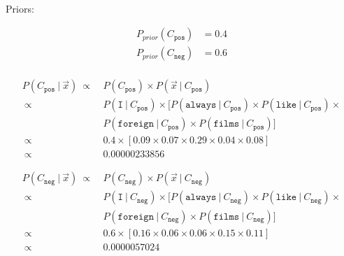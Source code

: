 \documentclass{article}
\newcommand\given[1][]{\ #1\vert\ }
\begin{document}
\paragraph{} Priors:

\begin{equation}
    \begin{split}
        P_{prior}(C_{\texttt{pos}}) &= 0.4 \\
        P_{prior}(C_{\texttt{neg}}) &= 0.6 \\
    \end{split}
\end{equation}

\begin{equation}
    \begin{split}
        P(C_{\texttt{pos}} \given \vec{x})\ \mathbin{\propto}&\ P(C_{\texttt{pos}}) \times P(\vec{x} \given C_{\texttt{pos}}) \\
        \ \mathbin{\propto}&\ P(\texttt{I} \given C_{\texttt{pos}}) \times [P(\texttt{always} \given C_{\texttt{pos}}) \times P(\texttt{like} \given C_{\texttt{pos}}) \times \\
        &\ P(\texttt{foreign} \given C_{\texttt{pos}}) \times P(\texttt{films} \given C_{\texttt{pos}}) ]\\
        \ \mathbin{\propto}&\ 0.4 \times [0.09 \times 0.07 \times 0.29  \times 0.04 \times 0.08] \\
        \ \mathbin{\propto}&\ 0.00000233856
    \end{split}
\end{equation}

\begin{equation}
    \begin{split}
        P(C_{\texttt{neg}} \given \vec{x})\ \mathbin{\propto}&\ P(C_{\texttt{neg}}) \times P(\vec{x} \given C_{\texttt{neg}}) \\
        \ \mathbin{\propto}&\ P(\texttt{I} \given C_{\texttt{neg}}) \times [P(\texttt{always} \given C_{\texttt{neg}}) \times P(\texttt{like} \given C_{\texttt{neg}}) \times \\
        &\ P(\texttt{foreign} \given C_{\texttt{neg}}) \times P(\texttt{films} \given C_{\texttt{neg}})] \\
        \ \mathbin{\propto}&\ 0.6 \times [0.16 \times 0.06 \times 0.06 \times 0.15 \times 0.11] \\
        \ \mathbin{\propto}&\ 0.0000057024
    \end{split}
\end{equation}
\end{document}

